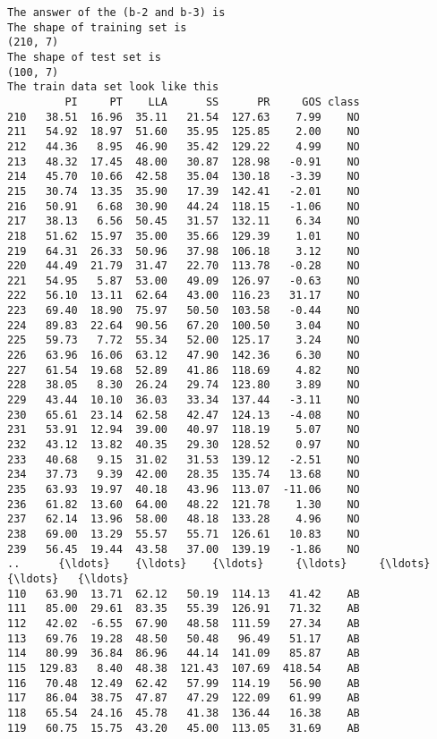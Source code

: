 \documentclass[11pt]{article}
\begin{document}
    \begin{Verbatim}[commandchars=\\\{\}]
The answer of the (b-2 and b-3) is 
The shape of training set is 
(210, 7)
The shape of test set is 
(100, 7)
The train data set look like this 
         PI     PT    LLA      SS      PR     GOS class
210   38.51  16.96  35.11   21.54  127.63    7.99    NO
211   54.92  18.97  51.60   35.95  125.85    2.00    NO
212   44.36   8.95  46.90   35.42  129.22    4.99    NO
213   48.32  17.45  48.00   30.87  128.98   -0.91    NO
214   45.70  10.66  42.58   35.04  130.18   -3.39    NO
215   30.74  13.35  35.90   17.39  142.41   -2.01    NO
216   50.91   6.68  30.90   44.24  118.15   -1.06    NO
217   38.13   6.56  50.45   31.57  132.11    6.34    NO
218   51.62  15.97  35.00   35.66  129.39    1.01    NO
219   64.31  26.33  50.96   37.98  106.18    3.12    NO
220   44.49  21.79  31.47   22.70  113.78   -0.28    NO
221   54.95   5.87  53.00   49.09  126.97   -0.63    NO
222   56.10  13.11  62.64   43.00  116.23   31.17    NO
223   69.40  18.90  75.97   50.50  103.58   -0.44    NO
224   89.83  22.64  90.56   67.20  100.50    3.04    NO
225   59.73   7.72  55.34   52.00  125.17    3.24    NO
226   63.96  16.06  63.12   47.90  142.36    6.30    NO
227   61.54  19.68  52.89   41.86  118.69    4.82    NO
228   38.05   8.30  26.24   29.74  123.80    3.89    NO
229   43.44  10.10  36.03   33.34  137.44   -3.11    NO
230   65.61  23.14  62.58   42.47  124.13   -4.08    NO
231   53.91  12.94  39.00   40.97  118.19    5.07    NO
232   43.12  13.82  40.35   29.30  128.52    0.97    NO
233   40.68   9.15  31.02   31.53  139.12   -2.51    NO
234   37.73   9.39  42.00   28.35  135.74   13.68    NO
235   63.93  19.97  40.18   43.96  113.07  -11.06    NO
236   61.82  13.60  64.00   48.22  121.78    1.30    NO
237   62.14  13.96  58.00   48.18  133.28    4.96    NO
238   69.00  13.29  55.57   55.71  126.61   10.83    NO
239   56.45  19.44  43.58   37.00  139.19   -1.86    NO
..      {\ldots}    {\ldots}    {\ldots}     {\ldots}     {\ldots}     {\ldots}   {\ldots}
110   63.90  13.71  62.12   50.19  114.13   41.42    AB
111   85.00  29.61  83.35   55.39  126.91   71.32    AB
112   42.02  -6.55  67.90   48.58  111.59   27.34    AB
113   69.76  19.28  48.50   50.48   96.49   51.17    AB
114   80.99  36.84  86.96   44.14  141.09   85.87    AB
115  129.83   8.40  48.38  121.43  107.69  418.54    AB
116   70.48  12.49  62.42   57.99  114.19   56.90    AB
117   86.04  38.75  47.87   47.29  122.09   61.99    AB
118   65.54  24.16  45.78   41.38  136.44   16.38    AB
119   60.75  15.75  43.20   45.00  113.05   31.69    AB

\end{Verbatim}
\end{document}

